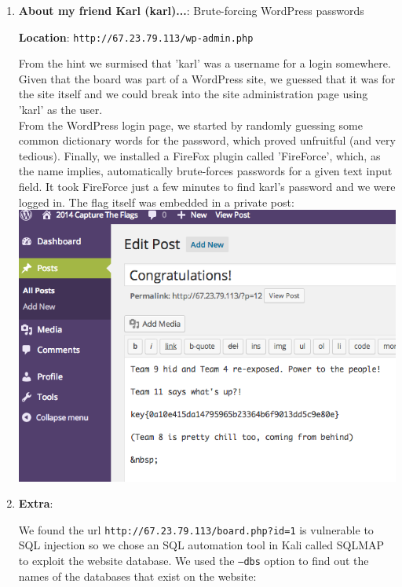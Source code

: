 \documentclass[12pt]{article}
\begin{document}
\begin{enumerate}[1.]
\item \textbf{About my friend Karl (karl)...}: Brute-forcing WordPress passwords

\textbf{Location}: \texttt{http://67.23.79.113/wp-admin.php}

From the hint we surmised that 'karl' was a username for a login somewhere. 
Given that the board was part of a WordPress site, we guessed that it was for 
the site itself and we could break into the site administration page  
using 'karl' as the user. \\

From the WordPress login page, we started by randomly guessing some common 
dictionary words for the password, which proved unfruitful (and very tedious). 
Finally, we installed a FireFox plugin called 'FireForce', which, as the name 
implies, automatically brute-forces passwords for a given text input field. It
took FireForce just a few minutes to find karl's password and we were logged 
in. The flag itself was embedded in a private post: \\

\includegraphics[scale=0.65]{images/flag10} \\

\newpage 

\item \textbf{Extra}:

We found the url \texttt{http://67.23.79.113/board.php?id=1} is vulnerable to SQL injection so we chose an SQL automation tool in Kali called SQLMAP to exploit the website database. We used the \texttt{--dbs} option to find out the names of the databases that exist on the website: \\


\end{enumerate}
\end{document}

